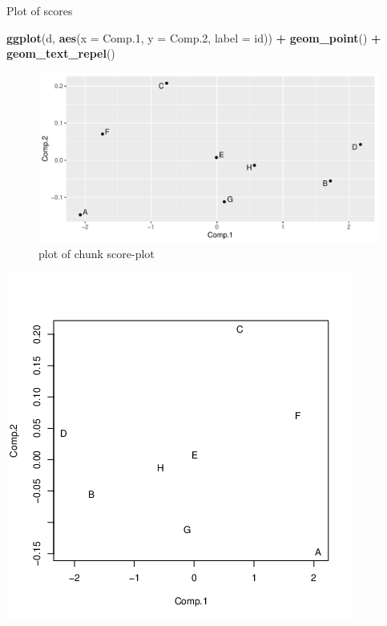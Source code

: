 \documentclass[ignorenonframetext,]{beamer}
\newenvironment{Shaded}{\begin{snugshade}}{\end{snugshade}}
\newcommand{\DataTypeTok}[1]{\textcolor[rgb]{0.13,0.29,0.53}{#1}}
\newcommand{\FloatTok}[1]{\textcolor[rgb]{0.00,0.00,0.81}{#1}}
\newcommand{\KeywordTok}[1]{\textcolor[rgb]{0.13,0.29,0.53}{\textbf{#1}}}
\newcommand{\NormalTok}[1]{#1}
\newcommand{\OperatorTok}[1]{\textcolor[rgb]{0.81,0.36,0.00}{\textbf{#1}}}
\newcommand{\StringTok}[1]{\textcolor[rgb]{0.31,0.60,0.02}{#1}}
\begin{document}
\begin{frame}[fragile]{Plot of scores}
\protect\hypertarget{plot-of-scores}{}

\begin{Shaded}
\begin{Highlighting}[]
\KeywordTok{ggplot}\NormalTok{(d, }\KeywordTok{aes}\NormalTok{(}\DataTypeTok{x =}\NormalTok{ Comp}\FloatTok{.1}\NormalTok{, }\DataTypeTok{y =}\NormalTok{ Comp}\FloatTok{.2}\NormalTok{, }\DataTypeTok{label =}\NormalTok{ id)) }\OperatorTok{+}
\StringTok{  }\KeywordTok{geom_point}\NormalTok{() }\OperatorTok{+}\StringTok{ }\KeywordTok{geom_text_repel}\NormalTok{()}
\end{Highlighting}
\end{Shaded}

\begin{figure}
\centering
\includegraphics{figure/score-plot-1.pdf}
\caption{plot of chunk score-plot}
\end{figure}

\includegraphics{bPrincomp-score-plot.png}

\end{frame}
\end{document}
